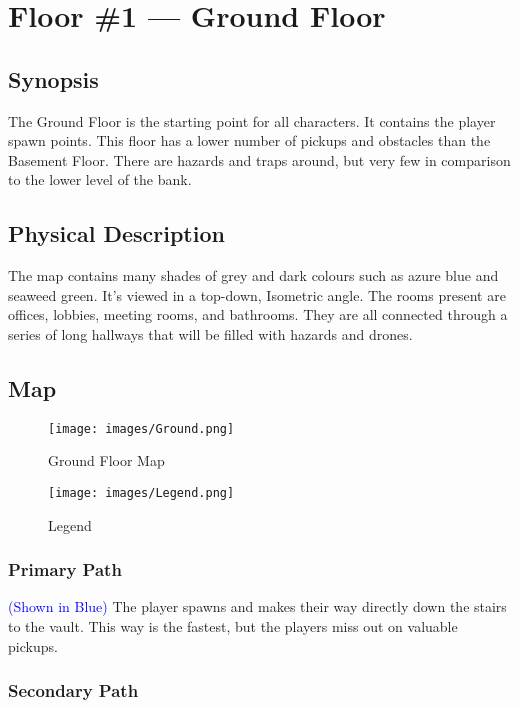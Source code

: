 \documentclass[10pt]{report}
\begin{document}
\section{Floor \#1 --- Ground Floor}

\subsection{Synopsis}

The Ground Floor is the starting point for all characters. It contains the player spawn points. This floor has a lower number of pickups and obstacles than the Basement Floor. There are hazards and traps around, but very few in comparison to the lower level of the bank.

\subsection{Physical Description}

The map contains many shades of grey and dark colours such as azure blue and seaweed green. It’s viewed in a top-down, Isometric angle. The rooms present are offices, lobbies, meeting rooms, and bathrooms. They are all connected through a series of long hallways that will be filled with hazards and drones.

\subsection{Map}

\begin{figure}[H]
    \centering
    \texttt{[image: images/Ground.png]}
    \caption{Ground Floor Map}
\end{figure}

\begin{figure}[H]
    \centering
    \texttt{[image: images/Legend.png]}
    \caption{Legend}
\end{figure}

\subsubsection{Primary Path}

\textcolor{blue}{(Shown in Blue)} The player spawns and makes their way directly down the stairs to the vault. This way is the fastest, but the players miss out on valuable pickups.

\subsubsection{Secondary Path}
\end{document}
